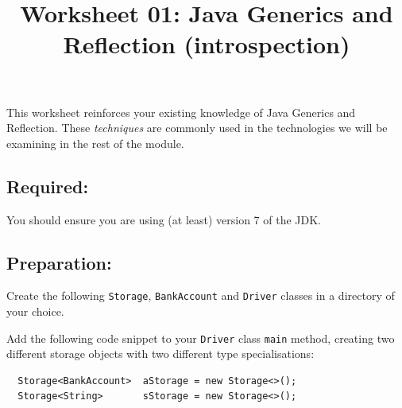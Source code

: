 \documentclass[11pt,a4paper]{exam}
\title{Worksheet 01: Java Generics and Reflection (introspection)}
\author{}
\date{}
\begin{document}
\maketitle

This worksheet reinforces your existing knowledge of Java Generics and Reflection. These \emph{techniques} are
commonly used in the technologies we will be examining in the rest of the module. 

\subsection*{Required:}

You should ensure you are using (at least) version 7 of the JDK.

\subsection*{Preparation:}

Create the following \texttt{Storage}, \texttt{BankAccount} and \texttt{Driver} classes in a directory of your choice.


Add the following code snippet to your \texttt{Driver} class \texttt{main} method, 
creating two different storage
objects with two different type specialisations:

\begin{Verbatim}
  Storage<BankAccount>  aStorage = new Storage<>();
  Storage<String>       sStorage = new Storage<>();
\end{Verbatim}
\end{document}
